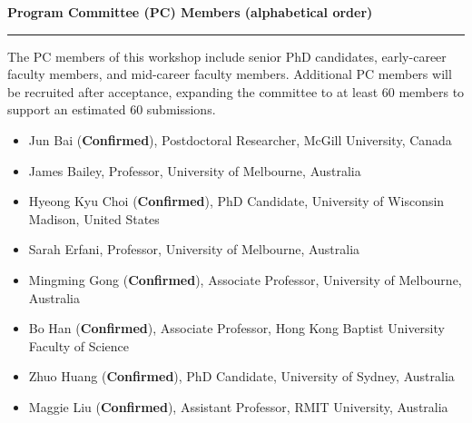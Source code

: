 \documentclass{article}
\newcommand{\confirmed}{\textcolor{green!60!black}{\textbf{Confirmed}}}
\newcommand{\sectiontitle}[1]{\noindent\textbf{\textcolor{neuripsblue}{#1}}\vspace{0.1cm}\hrule\vspace{0.2cm}}
\begin{document}
\sectiontitle{Program Committee (PC) Members (alphabetical order)}
\vspace{-2pt}
The PC members of this workshop include senior PhD candidates, early-career faculty members, and mid-career faculty members.
Additional PC members will be recruited after acceptance, expanding the committee to at least 60 members to support an estimated 60 submissions.
\begin{itemize}[leftmargin=10pt,nosep]
\item Jun Bai (\confirmed), Postdoctoral Researcher, McGill University, Canada
\item James Bailey, Professor, University of Melbourne, Australia
\item Hyeong Kyu Choi (\confirmed), PhD Candidate, University of Wisconsin Madison, United States
\item Sarah Erfani, Professor, University of Melbourne, Australia
\item Mingming Gong (\confirmed), Associate Professor, University of Melbourne, Australia
\item Bo Han (\confirmed), Associate Professor, Hong Kong Baptist University Faculty of Science
\item Zhuo Huang (\confirmed), PhD Candidate, University of Sydney, Australia
\item Maggie Liu (\confirmed), Assistant Professor, RMIT University, Australia

\end{itemize}
\end{document}

